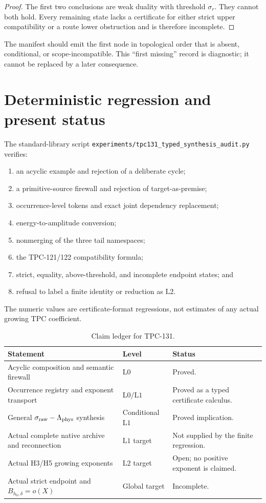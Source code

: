 \documentclass[11pt]{article}
\theoremstyle{definition}
\theoremstyle{remark}
\newcommand{\Lzero}{\mathrm{L0}}
\newcommand{\Lone}{\mathrm{L1}}
\newcommand{\Ltwo}{\mathrm{L2}}
\begin{document}
\begin{proof}
The first two conclusions are weak duality with threshold
\(\sigma_r\).  They cannot both hold.  Every remaining state lacks a
certificate for either strict upper compatibility or a route lower
obstruction and is therefore incomplete.
\end{proof}

The manifest should emit the first node in topological order that is
absent, conditional, or scope-incompatible.  This ``first missing''
record is diagnostic; it cannot be replaced by a later consequence.

\section{Deterministic regression and present status}

The standard-library script
\texttt{experiments/tpc131\_typed\_synthesis\_audit.py} verifies:
\begin{enumerate}[leftmargin=2em]
\item an acyclic example and rejection of a deliberate cycle;
\item a primitive-source firewall and rejection of target-as-premise;
\item occurrence-level tokens and exact joint dependency replacement;
\item energy-to-amplitude conversion;
\item nonmerging of the three tail namespaces;
\item the TPC-121/122 compatibility formula;
\item strict, equality, above-threshold, and incomplete endpoint
states; and
\item refusal to label a finite identity or reduction as \(\Ltwo\).
\end{enumerate}
The numeric values are certificate-format regressions, not estimates
of any actual growing TPC coefficient.

\begin{table}[htbp]
\centering
\small
\caption{Claim ledger for TPC-131.}
\begin{tabularx}{\textwidth}{@{}P{0.41\textwidth}P{0.15\textwidth}Y@{}}
\toprule
Statement & Level & Status\\
\midrule
Acyclic composition and semantic firewall &
\(\Lzero\) & Proved.\\
Occurrence registry and exponent transport &
\(\Lzero/\Lone\) & Proved as a typed certificate calculus.\\
General \(\sigma_{\rm raw}-\Lambda_{\rm phys}\) synthesis &
Conditional \(\Lone\) & Proved implication.\\
Actual complete native archive and reconnection &
\(\Lone\) target & Not supplied by the finite regression.\\
Actual H3/H5 growing exponents &
\(\Ltwo\) target & Open; no positive exponent is claimed.\\
Actual strict endpoint and \(B_{h_0,\delta}=o(X)\) &
Global target & Incomplete.\\
\bottomrule
\end{tabularx}
\end{table}
\end{document}
